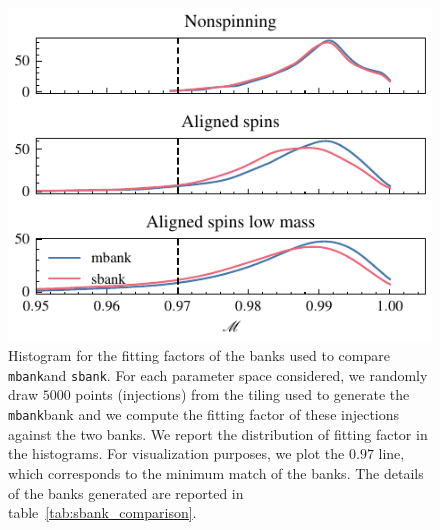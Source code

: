 \documentclass[twocolumn,showpacs,preprintnumbers,nofootinbib,prd,
superscriptaddress,10pt]{revtex4-2}
\newcommand{\mbank}{\texttt{mbank}}
\begin{document}
\begin{figure}[t!]
	\includegraphics{sbank_comparison}
	\caption{Histogram for the fitting factors of the banks used to compare \mbank and \texttt{sbank}. For each parameter space considered, we randomly draw $5000$ points (injections) from the tiling used to generate the \mbank bank and we compute the fitting factor of these injections against the two banks. We report the distribution of fitting factor in the histograms. For visualization purposes, we plot the $0.97$ line, which corresponds to the minimum match of the banks.
	The details of the banks generated are reported in table~\ref{tab:sbank_comparison}.
	}
	\label{fig:sbank_comparison}
\end{figure}
\end{document}
